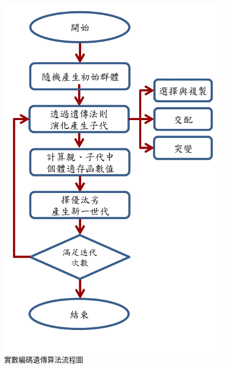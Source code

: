 \documentclass[14pt,a4paper]{report}  %
\begin{document}
{\begin{figure}[hbt!]
        \includegraphics[scale=0.3]{實數編碼遺傳算法.png} 
        \caption{實數編碼遺傳算法流程圖}
        \label{fig:scale}
        \end{figure}
        
}
\end{document}
